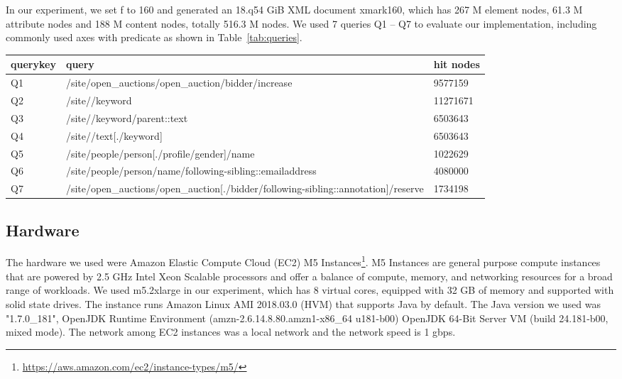 In our experiment, we set f to 160 and generated an 18.q54 GiB XML document
xmark160, which has 267 M element nodes, 61.3 M attribute nodes and 188 M
content nodes, totally 516.3 M nodes. We used 7 queries Q1 -- Q7 to evaluate our
implementation, including commonly used axes with predicate as  shown in
Table~\ref{tab:queries}.


\begin{table*}[ht]
	\centering
	\caption{Queries used for xmark160 dataset.}
	\label{tab:queries}
	\begin{tabular}{|l|l|l|}
		\hline
		querykey & query                                                                                  & hit nodes \\ \hline
		Q1       & /site/open\_auctions/open\_auction/bidder/increase                                     & 9577159   \\ \hline
		Q2       & /site//keyword                                                                         & 11271671  \\ \hline
		Q3       & /site//keyword/parent::text                                                            & 6503643   \\ \hline
		Q4       & /site//text{[}./keyword{]}                                                             & 6503643   \\ \hline
		Q5       & /site/people/person{[}./profile/gender{]}/name                                         & 1022629   \\ \hline
		Q6       & /site/people/person/name/following-sibling::emailaddress                               & 4080000   \\ \hline
		Q7       & /site/open\_auctions/open\_auction{[}./bidder/following-sibling::annotation{]}/reserve & 1734198   \\ \hline
	\end{tabular}
\end{table*}


\subsection{Hardware} 

The hardware we used were Amazon Elastic Compute Cloud (EC2) M5
Instances\footnote{\url{https://aws.amazon.com/ec2/instance-types/m5/}}. M5
Instances are general purpose compute instances that are powered by 2.5 GHz
Intel Xeon Scalable processors and offer a balance of compute, memory, and
networking resources for a broad range of workloads.  We used m5.2xlarge in our
experiment, which has 8 virtual cores, equipped with 32 GB of memory and
supported with solid state drives.  The instance runs Amazon Linux AMI 2018.03.0
(HVM) that supports Java by default. The Java version we used was "1.7.0\_181",
OpenJDK Runtime Environment (amzn-2.6.14.8.80.amzn1-x86\_64 u181-b00) OpenJDK
64-Bit Server VM (build 24.181-b00, mixed mode). The network among EC2 instances
was a local network and the network speed is 1 gbps.


